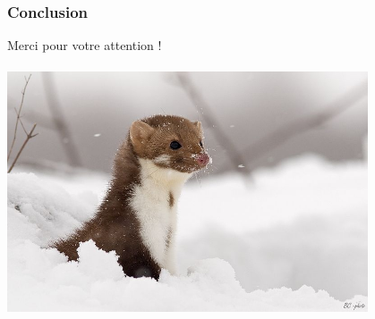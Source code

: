 \documentclass[xcolor=dvipsnames]{beamer}
\begin{document}
\begin{frame}
\frametitle{Conclusion}
 \centering
 \Large Merci pour votre attention ! \\ ~ \\
 \includegraphics[width = 0.8\textwidth]{fouine_hiver.jpg}
\end{frame}
\end{document}
